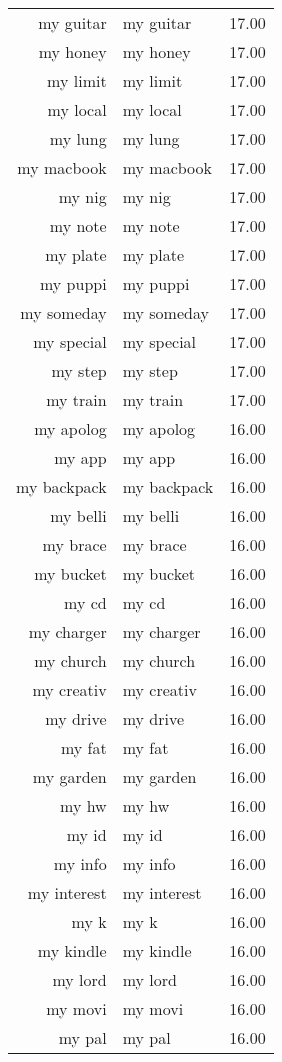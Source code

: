 \begin{table}[ht]
\begin{tabular}{rlr}
  my guitar & my guitar & 17.00 \\ 
  my honey & my honey & 17.00 \\ 
  my limit & my limit & 17.00 \\ 
  my local & my local & 17.00 \\ 
  my lung & my lung & 17.00 \\ 
  my macbook & my macbook & 17.00 \\ 
  my nig & my nig & 17.00 \\ 
  my note & my note & 17.00 \\ 
  my plate & my plate & 17.00 \\ 
  my puppi & my puppi & 17.00 \\ 
  my someday & my someday & 17.00 \\ 
  my special & my special & 17.00 \\ 
  my step & my step & 17.00 \\ 
  my train & my train & 17.00 \\ 
  my apolog & my apolog & 16.00 \\ 
  my app & my app & 16.00 \\ 
  my backpack & my backpack & 16.00 \\ 
  my belli & my belli & 16.00 \\ 
  my brace & my brace & 16.00 \\ 
  my bucket & my bucket & 16.00 \\ 
  my cd & my cd & 16.00 \\ 
  my charger & my charger & 16.00 \\ 
  my church & my church & 16.00 \\ 
  my creativ & my creativ & 16.00 \\ 
  my drive & my drive & 16.00 \\ 
  my fat & my fat & 16.00 \\ 
  my garden & my garden & 16.00 \\ 
  my hw & my hw & 16.00 \\ 
  my id & my id & 16.00 \\ 
  my info & my info & 16.00 \\ 
  my interest & my interest & 16.00 \\ 
  my k & my k & 16.00 \\ 
  my kindle & my kindle & 16.00 \\ 
  my lord & my lord & 16.00 \\ 
  my movi & my movi & 16.00 \\ 
  my pal & my pal & 16.00 \\ 

\end{tabular}
\end{table}
